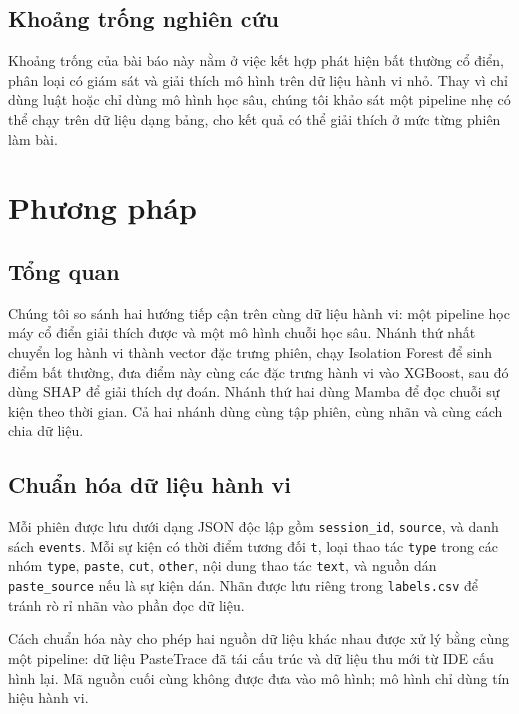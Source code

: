 \documentclass[runningheads]{llncs}
\begin{document}
\subsection{Khoảng trống nghiên cứu}
Khoảng trống của bài báo này nằm ở việc kết hợp phát hiện bất thường cổ điển,
phân loại có giám sát và giải thích mô hình trên dữ liệu hành vi nhỏ. Thay vì
chỉ dùng luật hoặc chỉ dùng mô hình học sâu, chúng tôi khảo sát một pipeline nhẹ
có thể chạy trên dữ liệu dạng bảng, cho kết quả có thể giải thích ở mức từng
phiên làm bài.

\section{Phương pháp}
\label{sec:method}

\subsection{Tổng quan}
Chúng tôi so sánh hai hướng tiếp cận trên cùng dữ liệu hành vi: một pipeline
học máy cổ điển giải thích được và một mô hình chuỗi học sâu. Nhánh thứ nhất
chuyển log hành vi thành vector đặc trưng phiên, chạy Isolation Forest để sinh
điểm bất thường, đưa điểm này cùng các đặc trưng hành vi vào XGBoost, sau đó
dùng SHAP để giải thích dự đoán. Nhánh thứ hai dùng Mamba để đọc chuỗi sự kiện
theo thời gian. Cả hai nhánh dùng cùng tập phiên, cùng nhãn và cùng cách chia
dữ liệu.

\subsection{Chuẩn hóa dữ liệu hành vi}
Mỗi phiên được lưu dưới dạng JSON độc lập gồm \texttt{session\_id},
\texttt{source}, và danh sách \texttt{events}. Mỗi sự kiện có thời điểm tương
đối \texttt{t}, loại thao tác \texttt{type} trong các nhóm \texttt{type},
\texttt{paste}, \texttt{cut}, \texttt{other}, nội dung thao tác \texttt{text},
và nguồn dán \texttt{paste\_source} nếu là sự kiện dán. Nhãn được lưu riêng
trong \texttt{labels.csv} để tránh rò rỉ nhãn vào phần đọc dữ liệu.

Cách chuẩn hóa này cho phép hai nguồn dữ liệu khác nhau được xử lý bằng cùng
một pipeline: dữ liệu PasteTrace đã tái cấu trúc và dữ liệu thu mới từ IDE cấu
hình lại. Mã nguồn cuối cùng không được đưa vào mô hình; mô hình chỉ dùng tín
hiệu hành vi.
\end{document}
